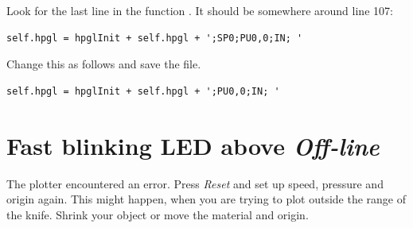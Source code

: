 Look for the last line in the function . It should be somewhere around line 107:
\begin{lstlisting}
self.hpgl = hpglInit + self.hpgl + ';SP0;PU0,0;IN; '
\end{lstlisting}
Change this as follows and save the file.
\begin{lstlisting}
self.hpgl = hpglInit + self.hpgl + ';PU0,0;IN; '
\end{lstlisting}

\section{Fast blinking LED above \textit{Off-line}}
The plotter encountered an error. Press \textit{Reset} and set up speed, pressure and origin again. This might happen, when you are trying to plot outside the range of the knife. Shrink your object or move the material and origin.